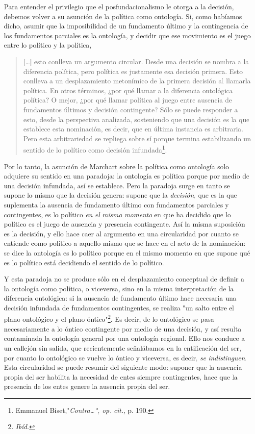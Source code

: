 \documentclass{book}
\begin{document}
Para entender el privilegio que el posfundacionalismo le otorga a la
decisión, debemos volver a su asunción de la política como ontología.
Si, como habíamos dicho, asumir que la imposibilidad de un fundamento
último y la contingencia de los fundamentos parciales es la ontología, y
decidir que ese movimiento es el juego entre lo político y la política,

\begin{quote}
{[}\ldots{]} esto conlleva un argumento circular. Desde una decisión se
nombra a la diferencia política, pero política es justamente esa
decisión primera. Esto conlleva a un desplazamiento metonímico de la
primera decisión al llamarla política. En otros términos, ¿por qué
llamar a la diferencia ontológica política? O mejor, ¿por qué llamar
política al juego entre ausencia de fundamentos últimos y decisión
contingente? Sólo se puede responder a esto, desde la perspectiva
analizada, sosteniendo que una decisión es la que establece esta
nominación, es decir, que en última instancia es arbitraria. Pero esta
arbitrariedad se repliega sobre sí porque termina estabilizando un
sentido de lo político como decisión infundada\footnote{Emmanuel
  Biset,"\emph{Contra\ldots", op. cit.,} p. 190.}.
\end{quote}

Por lo tanto, la asunción de Marchart sobre la política como ontología
solo adquiere su sentido en una paradoja: la ontología es política
porque por medio de una decisión infundada, así se establece. Pero la
paradoja surge en tanto se supone lo mismo que la decisión genera:
supone que la \emph{decisión}, que es la que suplementa la ausencia de
fundamento último con fundamentos parciales y contingentes, es lo
político \emph{en el mismo momento} en que ha decidido que lo político
es el juego de ausencia y presencia contingente. Así la misma suposición
es la decisión, y ello hace caer al argumento en una circularidad por
cuanto se entiende como político a aquello mismo que se hace en el acto
de la nominación: se dice la ontología es lo político porque en el mismo
momento en que supone qué es lo político está decidiendo el sentido de
lo político.

Y esta paradoja no se produce sólo en el desplazamiento conceptual de
definir a la ontología como política, o viceversa, sino en la misma
interpretación de la diferencia ontológica: si la ausencia de fundamento
último hace necesaria una decisión infundada de fundamentos
contingentes, se realiza "un salto entre el plano ontológico y el plano
óntico"\footnote{\emph{Ibíd.}}. Es decir, de lo ontológico se pasa
necesariamente a lo óntico contingente por medio de una decisión, y así
resulta contaminada la ontología general por una ontología regional.
Ello nos conduce a un callejón sin salida, que recientemente señalábamos
en la entificación del ser, por cuanto lo ontológico se vuelve lo óntico
y viceversa, es decir, \emph{se indistinguen}. Esta circularidad se
puede resumir del siguiente modo: suponer que la ausencia propia del ser
habilita la necesidad de entes siempre contingentes, hace que la
presencia de los entes genere la ausencia propia del ser.
\end{document}
